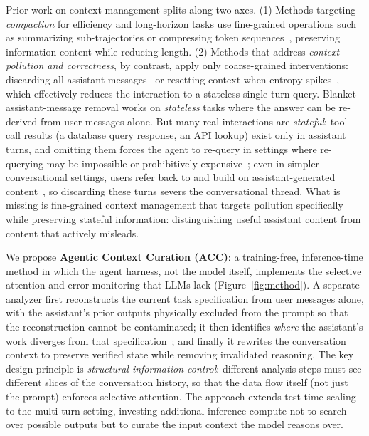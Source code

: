 \documentclass{article}
\begin{document}
Prior work on context management splits along two axes. (1) Methods targeting \emph{compaction} for efficiency and long-horizon tasks use fine-grained operations such as summarizing sub-trajectories or compressing token sequences~\citep{schroeder2025thread,zhang2025rlm,sun2025contextfolding}, preserving information content while reducing length. (2) Methods that address \emph{context pollution and correctness}, by contrast, apply only coarse-grained interventions: discarding all assistant messages~\citep{huang2026context} or resetting context when entropy spikes~\citep{khalid2025ergo}, which effectively reduces the interaction to a stateless single-turn query.
Blanket assistant-message removal works on \emph{stateless} tasks where the answer can be re-derived from user messages alone. But many real interactions are \emph{stateful}: tool-call results (a database query response, an API lookup) exist only in assistant turns, and omitting them forces the agent to re-query in settings where re-querying may be impossible or prohibitively expensive~\citep{barres2025tau2}; even in simpler conversational settings, users refer back to and build on assistant-generated content~\citep{huang2026context}, so discarding these turns severs the conversational thread. What is missing is fine-grained context management that targets pollution specifically while preserving stateful information: distinguishing useful assistant content from content that actively misleads.

We propose \textbf{Agentic Context Curation (ACC)}: a training-free, inference-time method in which the agent harness, not the model itself, implements the selective attention and error monitoring that LLMs lack (Figure~\ref{fig:method}). A separate analyzer first reconstructs the current task specification from user messages alone, with the assistant's prior outputs physically excluded from the prompt so that the reconstruction cannot be contaminated; it then identifies \emph{where} the assistant's work diverges from that specification~\citep{tyen2024errors}; and finally it rewrites the conversation context to preserve verified state while removing invalidated reasoning. The key design principle is \emph{structural information control}: different analysis steps must see different slices of the conversation history, so that the data flow itself (not just the prompt) enforces selective attention. The approach extends test-time scaling~\citep{wei2022chain,wang2023selfconsistency,yao2024tree,snell2024scalettc} to the multi-turn setting, investing additional inference compute not to search over possible outputs but to curate the input context the model reasons over.
\end{document}
